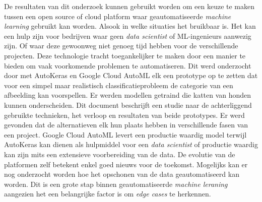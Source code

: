 De resultaten van dit onderzoek kunnen gebruikt worden om een keuze te maken tussen een open source of cloud platform waar geautomatiseerde \textit{machine learning} gebruikt kan worden. Alsook in welke situaties het bruikbaar is. Het kan een hulp zijn voor bedrijven waar geen \textit{data scientist} of ML-ingenieurs aanwezig zijn. Of waar deze gewoonweg niet genoeg tijd hebben voor de verschillende projecten. Deze technologie tracht  toegankelijker te maken door een manier te bieden om vaak voorkomende problemen te automatiseren. Dit werd onderzocht door met AutoKeras en Google Cloud AutoML elk een prototype op te zetten dat voor een simpel maar realistisch classificatieprobleem de categorie van een afbeelding kan voorspellen. Er werden modellen getraind die katten van honden kunnen onderscheiden. Dit document beschrijft een studie naar de achterliggend gebruikte technieken, het verloop en resultaten van beide prototypes. Er werd gevonden dat de alternatieven elk hun plaats hebben in verschillende fasen van een project. Google Cloud AutoML levert een productie waardig model terwijl AutoKeras kan dienen als hulpmiddel voor een \textit{data scientist} of productie waardig kan zijn mits een extensieve voorbereiding van de data. De evolutie van de platformen zelf betekent enkel goed nieuws voor de toekomst. Mogelijks kan er nog onderzocht worden hoe het opschonen van de data geautomatiseerd kan worden. Dit is een grote stap binnen geautomatiseerde \textit{machine leraning} aangezien het een belangrijke factor is om \textit{edge cases} te herkennen.